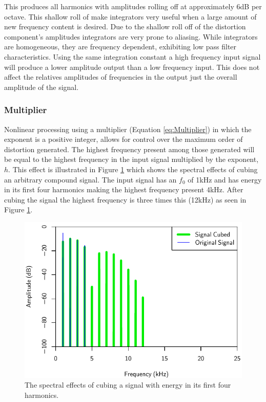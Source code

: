 			This produces all harmonics with amplitudes rolling off at approximately 6dB per octave. This
			shallow roll of make integrators very useful when a large amount of new frequency content is
			desired. Due to the shallow roll off of the distortion component's amplitudes integrators are very
			prone to aliasing. While integrators are homogeneous, they are frequency dependent, exhibiting low
			pass filter characteristics. Using the same integration constant a high frequency input signal will
			produce a lower amplitude output than a low frequency input. This does not affect the relatives
			amplitudes of frequencies in the output just the overall amplitude of the signal.

		\subsubsection*{Multiplier}
			Nonlinear processing using a multiplier (Equation \ref{eq:Multiplier}) in which the exponent is a
			positive integer, allows for control over the maximum order of distortion generated. The highest
			frequency present among those generated will be equal to the highest frequency in the input signal
			multiplied by the exponent, $h$. This effect is illustrated in Figure \ref{fig:CubedSpectra} which
			shows the spectral effects of cubing an arbitrary compound signal. The input signal has an $f_{0}$
			of 1kHz and has energy in its first four harmonics making the highest frequency present 4kHz. After
			cubing the signal the highest frequency is three times this (12kHz) as seen in Figure
			\ref{fig:CubedSpectra}.

			\begin{figure}[h!]
				\centering
				\includegraphics{chapter5/Images/CubedSpectra.pdf}
				\caption{The spectral effects of cubing a signal with energy in its first four harmonics.}
				\label{fig:CubedSpectra}
			\end{figure}

